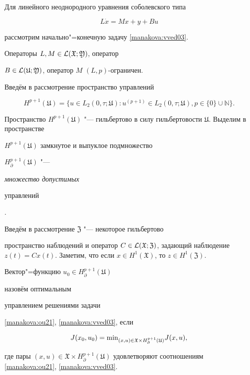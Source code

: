 \pagebreak




Для линейного неоднородного уравнения соболевского типа

\begin{equation}

L\dot x = Mx + y + Bu\label{manakova:ou21}

\end{equation}

рассмотрим начально"=конечную задачу \eqref{manakova:vved03}. 

Операторы $L, M \in {\cal L} (\mathfrak X; \mathfrak Y)$, оператор

$B \in {\cal L} (\mathfrak U; \mathfrak Y)$, оператор  $M$ $(L,p)$-ограничен.



Введём в рассмотрение пространство управлений

$$

{H}^{p+1} (\mathfrak U) =\{u\in L_2 (0,\tau; \mathfrak U): u^{(p+1)}\in L_2 (0, \tau; \mathfrak U), p\in\{0\}\cup \mathbb N \}.

$$

Пространство ${H}^{p+1} (\mathfrak U)$ "--- гильбертово  в силу гильбертовости $\mathfrak U$. Выделим в пространстве

${H}^{p+1} (\mathfrak U)$ замкнутое и выпуклое подмножество

${H}^{p+1}_{\partial} (\mathfrak U)$ "--- {\it множество допустимых

управлений}.



Введём в рассмотрение $\mathfrak Z$ "--- некоторое гильбертово

пространство наблюдений и оператор $C\in {\cal L} (\mathfrak X; \mathfrak Z)$, задающий наблюдение $z(t)= Cx(t)$. Заметим, что если $x\in H^1 (\mathfrak X)$, то $z\in H^1 (\mathfrak Z)$.



\begin{definition}

Вектор"=функцию $u_0\in {H}^{p+1}_\partial (\mathfrak U)$ {назовём оптимальным %

управлением решениями задачи} \eqref{manakova:ou21}, \eqref{manakova:vved03}, если

$$

J(x_0,u_0)= {\rm min}_{(x, u) \in \mathfrak X \times {H}^{p+1}_\partial (\mathfrak U)} J(x,u),

$$

где пары $(x, u) \in \mathfrak X \times {H}^{p+1}_\partial (\mathfrak U)$ удовлетворяют соотношениям \eqref{manakova:ou21}, \eqref{manakova:vved03}.

\end{definition}




